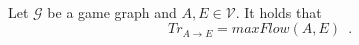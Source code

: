 {}
\begin{theorem} \ \\
   \label{trustflow}
   Let $\mathcal{G}$ be a game graph and $A, E \in \mathcal{V}$. It holds that
   \begin{equation*}
      Tr_{A \rightarrow E} = maxFlow\left(A, E\right) \enspace.
   \end{equation*}
\end{theorem}
